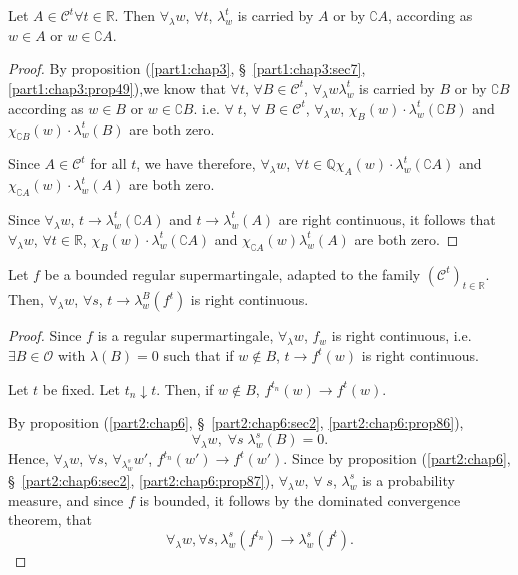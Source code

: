 \begin{proposition}\label{part2:chap6:prop88}
Let $A \in \mathscr{C}^t \forall t \in \mathbb{R}$. Then
$\forall_\lambda w$, $\forall t$, $\lambda^t_w$ is carried by $A$ or
by $\complement A$, according as $w \in A$ or $w \in \complement A$. 
\end{proposition}

\begin{proof}
By proposition (\ref{part1:chap3}, \S\ \ref{part1:chap3:sec7},
\ref{part1:chap3:prop49}),\pageoriginale we know that $\forall 
t$, $\forall B \in \mathscr{C}^t$, $\forall_\lambda w \lambda^t_w$ is
carried by $B$ or by $\complement B$ according as $w \in B$ or $w \in
\complement B$. i.e. $\forall \; t$, $\forall \; B \in \mathscr{C}^t$,
$\forall_\lambda w$, $\chi_B(w) \cdot \lambda^t_w(\complement B)$ and
$\chi_{\complement B} (w) \cdot \lambda^t_w(B)$ are both zero. 

Since $A \in\mathscr{C}^t$ for all $t$, we have therefore,
$\forall_\lambda w$, $\forall t \in \mathbb{Q} \chi_A(w) \cdot
\lambda^t_w(\complement A)$ and $\chi_{\complement A} (w) \cdot
\lambda^t_w(A)$ are both zero.

Since $\forall_\lambda w$, $t \to \lambda^t_w(\complement A)$ and $t
\to \lambda^t_w(A)$ are right continuous, it follows that
$\forall_\lambda w$, $\forall t \in \mathbb{R}$, $\chi_B(w) \cdot
\lambda^t_w(\complement A)$ and $\chi_{\complement A} (w)
\lambda^t_w(A)$ are both zero.
\end{proof}

\begin{proposition}\label{part2:chap6:prop89}
Let $f$ be a bounded regular supermartingale, adapted to the family
$(\mathscr{C}^t)_{t \in \mathbb{R}}$. Then, $\forall_\lambda w$,
$\forall s$, $t \to \lambda^B_w(f^t)$ is right continuous.
\end{proposition}

\begin{proof}
Since $f$ is a regular supermartingale, $\forall_\lambda w$, $f_w$ is
right continuous, i.e. $\exists B \in \mathscr{O}$ with $\lambda(B)
=0$ such that if $w \not\in B$, $t \to f^t(w)$ is right continuous.

Let $t$ be fixed. Let $t_n \downarrow t$. Then, if $w \not\in B$,
$f^{t_n}(w) \to f^t(w)$. 

By proposition (\ref{part2:chap6}, \S\ \ref{part2:chap6:sec2},
\ref{part2:chap6:prop86}),  
$$
\forall_\lambda w, \; \forall s\;  \lambda^s_w(B) = 0. 
$$
Hence, $\forall_\lambda w$, $\forall s$, $\forall_{\lambda^s_w} w'$,
$f^{t_n} (w') \to f^t(w')$. Since by proposition (\ref{part2:chap6},
\S\ \ref{part2:chap6:sec2}, \ref{part2:chap6:prop87}), 
$\forall_\lambda w$, $\forall \; s$, $\lambda^s_w$ is a probability
measure, and since $f$ is bounded, it follows by the dominated
convergence theorem, that 
$$
\forall_\lambda w, \forall s, \lambda^s_w(f^{t_n})  \to
\lambda^s_w(f^t). 
$$
\end{proof}

